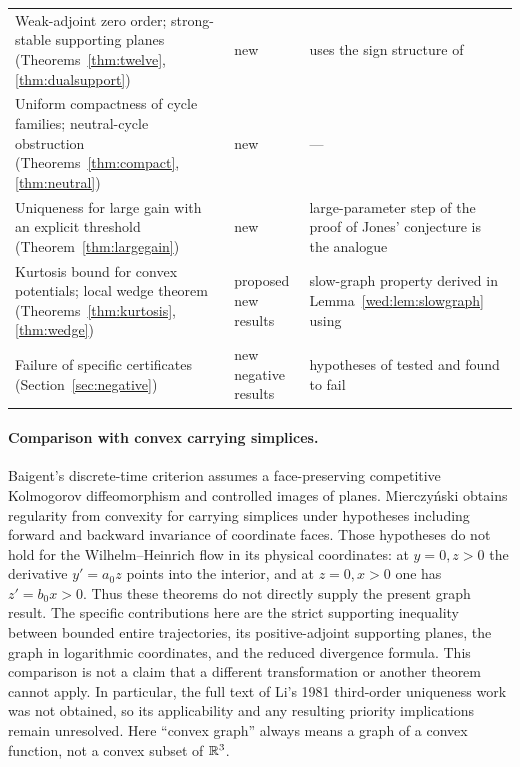 {\begin{longtable}{p{}p{}p{}}
Weak-adjoint zero order; strong-stable supporting planes (Theorems~\ref{thm:twelve}, \ref{thm:dualsupport}) & new & uses the sign structure of \cite{MPS90}\\
Uniform compactness of cycle families; neutral-cycle obstruction (Theorems~\ref{thm:compact}, \ref{thm:neutral}) & new & ---\\
Uniqueness for large gain with an explicit threshold (Theorem~\ref{thm:largegain}) & new & large-parameter step of the proof of Jones' conjecture \cite{Xie93} is the analogue\\
Kurtosis bound for convex potentials; local wedge theorem (Theorems~\ref{thm:kurtosis}, \ref{thm:wedge}) & proposed new results & slow-graph property derived in Lemma~\ref{wed:lem:slowgraph} using \cite{Eldering13}\\
Failure of specific certificates (Section~\ref{sec:negative}) & new negative results & hypotheses of \cite{Massera54,Zhang86,SmithHL86,SV10,GG21} tested and found to fail\\
\end{longtable}}

\paragraph{Comparison with convex carrying simplices.}
Baigent's discrete-time criterion \cite[Section~4, Theorem~6.1]{Baigent19}
assumes a face-preserving competitive Kolmogorov diffeomorphism and controlled
images of planes. Mierczy\'nski \cite[Sections~2--3]{Mierczynski20} obtains
regularity from convexity for carrying simplices under hypotheses including
forward and backward invariance of coordinate faces. Those hypotheses do not
hold for the Wilhelm--Heinrich flow in its physical coordinates: at $y=0,z>0$
the derivative $y'=a_0z$ points into the interior, and at $z=0,x>0$ one has
$z'=b_0x>0$. Thus these theorems do not directly supply the present graph result.
The specific contributions here are the strict supporting inequality between
bounded entire trajectories, its positive-adjoint supporting planes, the graph
in logarithmic coordinates, and the reduced divergence formula. This comparison
is not a claim that a different transformation or another theorem cannot apply.
In particular, the full text of Li's 1981 third-order uniqueness work was not
obtained, so its applicability and any resulting priority implications remain
unresolved. Here ``convex graph'' always means a graph of a convex function,
not a convex subset of $\mathbb R^3$.

